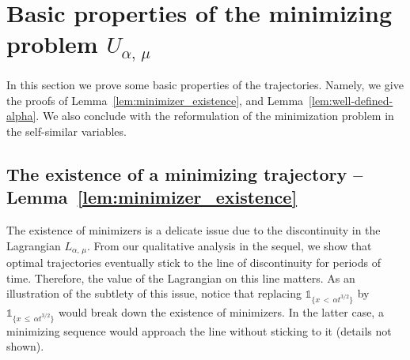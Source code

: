 \documentclass[10pt]{amsart}
\theoremstyle{definition}\newtheorem{defi}[theo]{Definition}\newtheorem{rema}[theo]{Remark}\newtheorem{exam}[theo]{Example}\newtheorem{exem}[theo]{Example}\newtheorem{nota}[theo]{Notation}
\newcommand{\1}{\mathds{1}}
\begin{document}
\section{Basic properties of the minimizing problem \texorpdfstring{$U_{\alpha,\,\mu}$}{U alpha, mu}}\label{sec:basic_trajectories}

In this section we prove some basic properties of the trajectories. Namely, we give the proofs of Lemma~\ref{lem:minimizer_existence}, and Lemma~\ref{lem:well-defined-alpha}. We also conclude with the reformulation of the minimization problem in the self-similar variables.



\subsection{The existence of a minimizing trajectory -- Lemma~\ref{lem:minimizer_existence}}\label{sec:41}

The existence of minimizers is a delicate issue due to the discontinuity in the Lagrangian $L_{\alpha,\,\mu}$. From our qualitative analysis in the sequel, we show that optimal trajectories eventually stick to the line of discontinuity for periods of time. Therefore, the value of the Lagrangian on this line matters. As an illustration of the subtlety of this issue, notice that replacing $\1_{\{ x\,<\,\alpha t^{3/2}\}} $ by $\1_{\{ x\,\leq\,\alpha t^{3/2}\}}$ would break down the existence of minimizers. In the latter case, a minimizing sequence would approach the line without sticking to it (details not shown).
\end{document}
